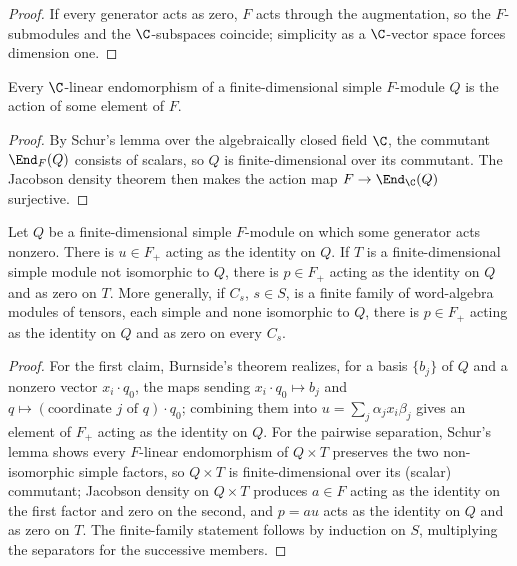 \begin{proof}
    \leanok
    If every generator acts as zero, $F$ acts through the augmentation, so
    the $F$-submodules and the $\C$-subspaces coincide; simplicity as a
    $\C$-vector space forces dimension one.
\end{proof}

\begin{lemma}
    \label{thm:asym_burnside}
    \leanok
    Every $\C$-linear endomorphism of a finite-dimensional simple
    $F$-module $Q$ is the action of some element of $F$.
\end{lemma}

\begin{proof}
    \leanok
    By Schur's lemma over the algebraically closed field $\C$, the
    commutant $\End_F(Q)$ consists of scalars, so $Q$ is finite-dimensional
    over its commutant. The Jacobson density theorem then makes the action
    map $F\to\End_{\C}(Q)$ surjective.
\end{proof}

\begin{lemma}
    \label{thm:asym_separation}
    \leanok
    Let $Q$ be a finite-dimensional simple $F$-module on which some
    generator acts nonzero. There is $u\in F_+$ acting as the identity on
    $Q$. If $T$ is a finite-dimensional simple module not isomorphic to
    $Q$, there is $p\in F_+$ acting as the identity on $Q$ and as zero on
    $T$. More generally, if $C_s$, $s\in S$, is a finite family of
    word-algebra modules of tensors, each simple and none isomorphic to
    $Q$, there is $p\in F_+$ acting as the identity on $Q$ and as zero on
    every $C_s$.
\end{lemma}

\begin{proof}
    \leanok
    For the first claim, Burnside's theorem realizes, for a basis
    $\{b_j\}$ of $Q$ and a nonzero vector $x_i\cdot q_0$, the maps sending
    $x_i\cdot q_0\mapsto b_j$ and $q\mapsto(\text{coordinate }j\text{ of
        }q)\cdot q_0$; combining them into
    $u=\sum_j\alpha_jx_i\beta_j$ gives an element of $F_+$ acting as the
    identity on $Q$. For the pairwise separation, Schur's lemma shows every
    $F$-linear endomorphism of $Q\times T$ preserves the two
    non-isomorphic simple factors, so $Q\times T$ is finite-dimensional
    over its (scalar) commutant; Jacobson density on $Q\times T$ produces
    $a\in F$ acting as the identity on the first factor and zero on the
    second, and $p=au$ acts as the identity on $Q$ and as zero on $T$. The
    finite-family statement follows by induction on $S$, multiplying the
    separators for the successive members.
\end{proof}


